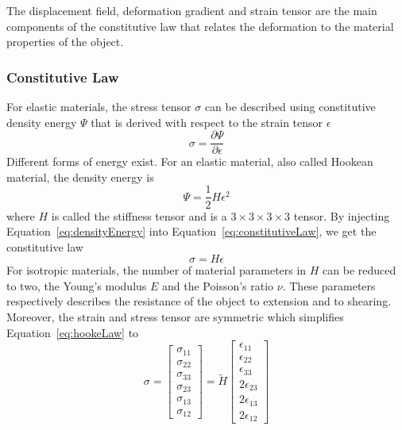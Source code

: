 The displacement field, deformation gradient and strain tensor are the main components of the constitutive law that relates the deformation to the material properties of the object.

\subsubsection{Constitutive Law}
For elastic materials, the stress tensor $\sigma$ can be described using constitutive density energy $\Psi$ that is derived with respect to the strain tensor $\epsilon$
\begin{equation}
\label{eq:constitutiveLaw}
\sigma = \frac{\partial \Psi}{\partial \epsilon}
\end{equation}
Different forms of energy exist. 
For an elastic material, also called Hookean material, the density energy is
\begin{equation}
\label{eq:densityEnergy}
\Psi = \frac{1}{2}H\epsilon^{2}
\end{equation}
where $H$ is called the stiffness tensor and is a $3\times3\times3\times3$ tensor. By injecting Equation~\eqref{eq:densityEnergy} into Equation~\eqref{eq:constitutiveLaw}, we get the constitutive law
\begin{equation}
\label{eq:hookeLaw}
\sigma = H\epsilon
\end{equation}
For isotropic materials, the number of material parameters in $H$ can be reduced to two, the Young's modulus $E$ and the Poisson's ratio $\nu$.
These parameters respectively describes the resistance of the object to extension and to shearing.
Moreover, the strain and stress tensor are symmetric which simplifies Equation~\eqref{eq:hookeLaw} to
\begin{equation}
\sigma = 
\begin{bmatrix}
\sigma_{11} \\
\sigma_{22} \\
\sigma_{33} \\
\sigma_{23} \\
\sigma_{13} \\
\sigma_{12}
\end{bmatrix}
=
\tilde{H}
\begin{bmatrix}
\epsilon_{11} \\
\epsilon_{22} \\
\epsilon_{33} \\
2\epsilon_{23} \\
2\epsilon_{13} \\
2\epsilon_{12}
\end{bmatrix}
\end{equation}
